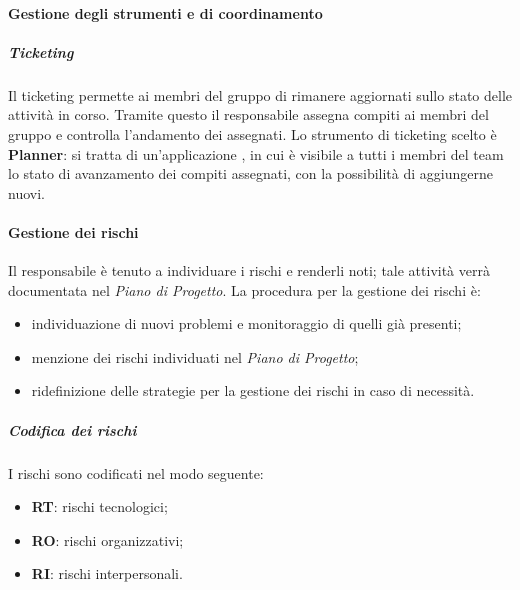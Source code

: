 \paragraph{Gestione degli strumenti e di coordinamento}
\subparagraph{Ticketing}
Il ticketing permette ai membri del gruppo di rimanere aggiornati sullo stato delle attività in corso. Tramite questo il responsabile assegna compiti ai membri del gruppo e controlla l'andamento dei  assegnati. Lo strumento di ticketing scelto è \textbf{Planner}: si tratta di un'applicazione , in cui è visibile a tutti i membri del team lo stato di avanzamento dei compiti assegnati, con la possibilità di aggiungerne nuovi. 

\paragraph{Gestione dei rischi}
Il responsabile è tenuto a individuare i rischi e renderli noti; tale attività verrà documentata nel \textit{Piano di Progetto}. La procedura per la gestione dei rischi è: 
\begin{itemize}
\item individuazione di nuovi problemi e monitoraggio di quelli già presenti;
\item menzione dei rischi individuati nel \textit{Piano di Progetto}; 
\item ridefinizione delle strategie per la gestione dei rischi in caso di necessità.
\end{itemize}

\subparagraph{Codifica dei rischi}
I rischi sono codificati nel modo seguente: 
\begin{itemize}
\item  \textbf{RT}: rischi tecnologici; 
\item \textbf{RO}: rischi organizzativi;
\item   \textbf{RI}: rischi interpersonali.
\end{itemize}


